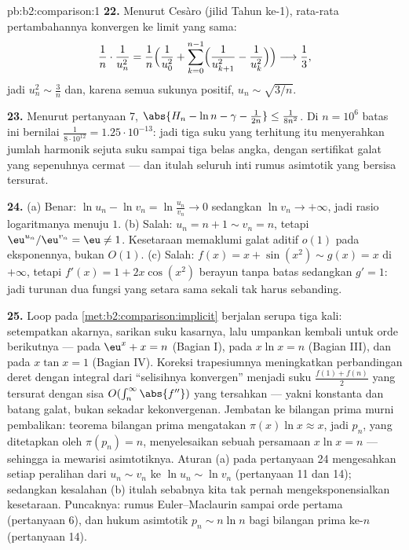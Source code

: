 \begin{solution}{pb:b2:comparison:1}
\textbf{22.} Menurut Cesàro (jilid Tahun ke-1), rata-rata
pertambahannya konvergen ke limit yang sama:
\[
\frac{1}{n}\cdot\frac{1}{u_n^2}
= \frac1n\Bigl(\frac1{u_0^2} + \sum_{k=0}^{n-1}
\Bigl(\frac1{u_{k+1}^2} - \frac1{u_k^2}\Bigr)\Bigr)
\longrightarrow \frac13 ,
\]
jadi $u_n^2 \sim \frac3n$ dan, karena semua sukunya positif, $u_n
\sim \sqrt{3/n}$.

\textbf{23.} Menurut pertanyaan 7, $\abs{H_n - \ln n - \gamma -
\frac1{2n}} \leq \frac1{8n^2}$. Di $n = 10^6$ batas ini bernilai
$\frac{1}{8\cdot10^{12}} = 1.25\cdot10^{-13}$: jadi tiga suku yang
terhitung itu menyerahkan jumlah harmonik sejuta suku sampai tiga belas
angka,  dengan sertifikat galat yang sepenuhnya cermat --- dan
itulah seluruh inti rumus asimtotik yang bersisa tersurat.

\textbf{24.} (a) Benar: $\ln u_n - \ln v_n = \ln\frac{u_n}{v_n}
\to 0$ sedangkan $\ln v_n \to +\infty$, jadi rasio logaritmanya
menuju $1$. (b) Salah: $u_n = n + 1 \sim v_n = n$, tetapi
$\eu^{u_n}/\eu^{v_n} = \eu \neq 1$. Kesetaraan memaklumi
galat aditif $o(1)$ pada eksponennya, bukan $O(1)$. (c) Salah:
$f(x) = x + \sin(x^2) \sim g(x) = x$ di $+\infty$, tetapi $f'(x)
= 1 + 2x\cos(x^2)$ berayun tanpa batas sedangkan $g' = 1$:
jadi turunan dua fungsi yang setara sama sekali tak harus sebanding.

\textbf{25.} Loop pada \cref{met:b2:comparison:implicit} berjalan
serupa tiga kali: setempatkan akarnya, sarikan suku
kasarnya, lalu umpankan kembali untuk orde berikutnya --- pada $\eu^x + x
= n$ (Bagian I), pada $x\ln x = n$ (Bagian III), dan pada $x\tan x = 1$
(Bagian IV). Koreksi trapesiumnya meningkatkan perbandingan deret
dengan integral dari ``selisihnya konvergen'' menjadi suku
$\frac{f(1) + f(n)}2$ yang tersurat dengan sisa $O(\int_n^\infty
\abs{f''})$ yang tersahkan --- yakni konstanta dan batang galat, bukan
sekadar kekonvergenan. Jembatan ke bilangan prima murni pembalikan:
teorema bilangan prima mengatakan $\pi(x)\ln x \approx x$, jadi $p_n$,
yang ditetapkan oleh $\pi(p_n) = n$, menyelesaikan sebuah persamaan
$x\ln x = n$ --- sehingga ia mewarisi asimtotiknya. Aturan (a) pada
pertanyaan 24 mengesahkan setiap peralihan dari $u_n \sim v_n$ ke $\ln
u_n \sim \ln v_n$ (pertanyaan 11 dan 14); sedangkan kesalahan (b) itulah
sebabnya kita tak pernah mengeksponensialkan kesetaraan. Puncaknya:
rumus Euler--Maclaurin sampai orde pertama (pertanyaan 6), dan hukum
asimtotik $p_n \sim n\ln n$ bagi bilangan prima ke-$n$ (pertanyaan 14).

\end{solution}
